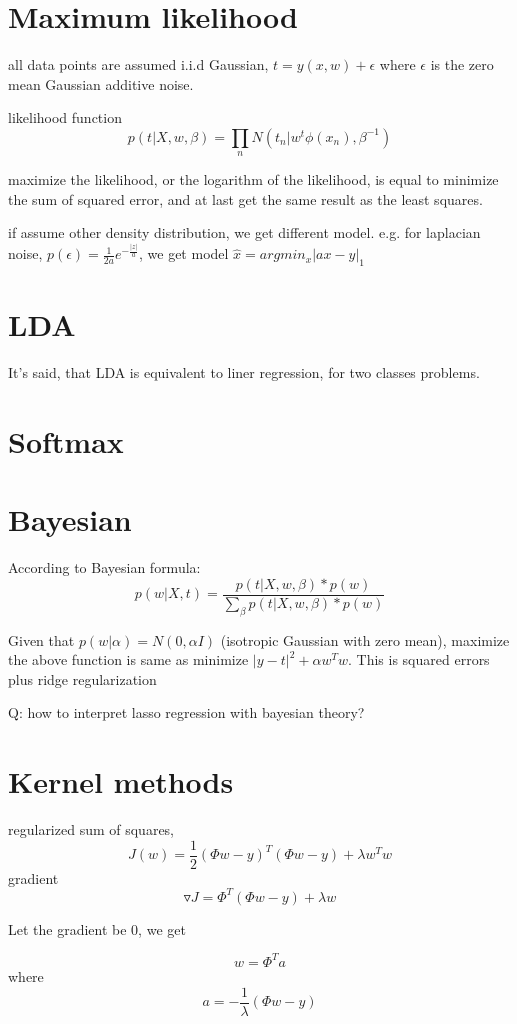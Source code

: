 \documentclass[10pt,a4paper]{book}
\begin{document}
\section{Maximum likelihood}
all data points are assumed i.i.d Gaussian, $t = y(x,w)+\epsilon$ where $\epsilon$ is the zero mean Gaussian additive noise.

likelihood function
$$p(t|X,w,\beta) = \prod_n N(t_n|w^t\phi(x_n), \beta^{-1}) $$

maximize the likelihood, or the logarithm of the likelihood, is equal to minimize the sum of squared error, and at last get the same result as the least squares.

if assume other density distribution, we get different model. e.g. for laplacian noise, $p(\epsilon) = {\frac 1 {2a}} e^{-\frac {|z|} {a}}$, we get model $\hat{x} = argmin_x |ax-y|_1$

\section {LDA}

It's said, that LDA is equivalent to liner regression, for two classes problems.

\section{Softmax}

\section{Bayesian}
According to Bayesian formula:
  $$ p(w|X,t) = \frac {p(t|X,w,\beta) * p(w)} {\sum_\beta  p(t|X,w,\beta) * p(w)} $$

Given that $p(w|\alpha) = N(0,\alpha I)$ (isotropic Gaussian with zero mean), maximize the above function is same as minimize $|y-t|^2 + \alpha w^Tw$. This is squared errors plus ridge regularization

Q: how to interpret lasso regression with bayesian theory?

\section{Kernel methods}
regularized sum of squares, 
$$ J(w) = \frac 1 2 (\Phi w - y)^T(\Phi w -y) + \lambda w^Tw$$
gradient
$$\triangledown J = \Phi^T (\Phi w - y) +\lambda w$$

Let the gradient be 0, we get

$$w = \Phi^T a$$
where
$$a = - \frac 1 \lambda (\Phi w - y)$$
\end{document}
